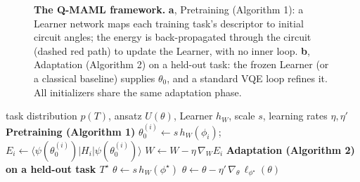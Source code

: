 \documentclass[pdflatex,sn-mathphys-num]{sn-jnl}
\begin{document}
\begin{figure}[!htb]
{}

\caption{\textbf{The Q-MAML framework.} \textbf{a}, Pretraining (Algorithm 1): a Learner network maps each training task's descriptor to initial circuit angles; the energy is back-propagated through the circuit (dashed red path) to update the Learner, with no inner loop. \textbf{b}, Adaptation (Algorithm 2) on a held-out task: the frozen Learner (or a classical baseline) supplies $\theta_0$, and a standard VQE loop refines it. All initializers share the same adaptation phase.}
\label{fig:framework}
\end{figure}

\begin{algorithm}[t]
\caption{Q-MAML pretraining and adaptation}\label{alg:qmaml}
\begin{algorithmic}[1]
\Require task distribution $p(T)$, ansatz $U(\theta)$, Learner $h_W$, scale $s$, learning rates $\eta,\eta'$
\Statex \textbf{Pretraining (Algorithm 1)}
    \State $\theta_0^{(i)}\gets s\,h_W(\phi_i)$; \quad $E_i\gets\langle\psi(\theta_0^{(i)})|H_i|\psi(\theta_0^{(i)})\rangle$
    \State $W\gets W-\eta\,\nabla_W E_i$ 
  \EndFor
\EndFor
\Statex \textbf{Adaptation (Algorithm 2) on a held-out task $T^\star$}
\State $\theta\gets s\,h_{W}(\phi^\star)$
 $\theta\gets\theta-\eta'\,\nabla_\theta\,\ell_{\phi^\star}(\theta)$ \EndFor
\end{algorithmic}
\end{algorithm}
\end{document}

